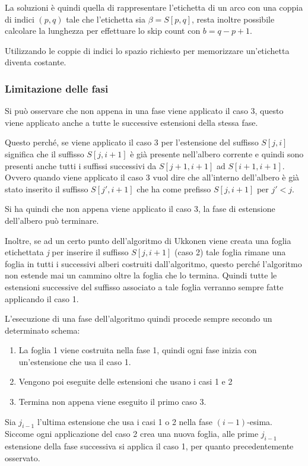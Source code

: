 La soluzioni è quindi quella di rappresentare l'etichetta di un arco con una coppia di indici $(p,q)$ tale che l'etichetta sia $\beta = S[p,q]$, resta inoltre possibile calcolare la lunghezza per effettuare lo skip count con $b = q -p+1$.

Utilizzando le coppie di indici lo spazio richiesto per memorizzare un'etichetta diventa costante.

\subsubsection{Limitazione delle fasi}

Si può osservare che non appena in una fase viene applicato il caso 3, questo viene applicato anche a tutte le successive estensioni della stessa fase.

Questo perché, se viene applicato il caso 3 per l'estensione del suffisso $S[j,i]$ significa che il suffisso $S[j,i+1]$ è già presente nell'albero corrente e quindi sono presenti anche tutti i suffissi successivi da $S[j+1,i+1]$ ad $S[i+1,i+1]$.
Ovvero quando viene applicato il caso 3 vuol dire che all'interno dell'albero è già stato inserito il suffisso $S[j',i+1]$ che ha come prefisso $S[j,i+1]$ per $j' < j$.

Si ha quindi che non appena viene applicato il caso 3, la fase di estensione dell'albero può terminare.

Inoltre, se ad un certo punto dell'algoritmo di Ukkonen viene creata una foglia etichettata \textit{j} per inserire il suffisso $S[j,i+1]$ (caso 2) tale foglia rimane una foglia in tutti i successivi alberi costruiti dall'algoritmo, questo perché l'algoritmo non estende mai un cammino oltre la foglia che lo termina. Quindi tutte le estensioni successive del suffisso associato a tale foglia verranno sempre fatte applicando il caso 1.

L'esecuzione di una fase dell'algoritmo quindi procede sempre secondo un determinato schema:

\begin{enumerate}
	\item La foglia 1 viene costruita nella fase 1, quindi ogni fase inizia con un'estensione che usa il caso 1.
	\item Vengono poi eseguite delle estensioni che usano i casi 1 e 2
	\item Termina non appena viene eseguito il primo caso 3.
\end{enumerate}

Sia $j_{i-1}$ l'ultima estensione che usa i casi 1 o 2 nella fase $(i-1)$-esima. Siccome ogni applicazione del caso 2 crea una nuova foglia, alle prime $j_{i-1}$ estensione della fase successiva si applica il caso 1, per quanto precedentemente osservato.

